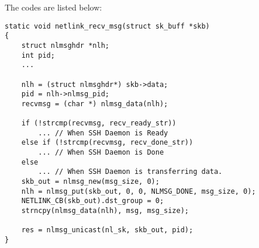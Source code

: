 The codes are listed below:
\newpage
\begin{lstlisting}[title=\bfseries Message Receiving]
static void netlink_recv_msg(struct sk_buff *skb)
{
    struct nlmsghdr *nlh;
    int pid;
	...   

    nlh = (struct nlmsghdr*) skb->data;
    pid = nlh->nlmsg_pid;
    recvmsg = (char *) nlmsg_data(nlh);

    if (!strcmp(recvmsg, recv_ready_str))
        ... // When SSH Daemon is Ready
    else if (!strcmp(recvmsg, recv_done_str))
    	... // When SSH Daemon is Done
    else
    	... // When SSH Daemon is transferring data.
    skb_out = nlmsg_new(msg_size, 0);
    nlh = nlmsg_put(skb_out, 0, 0, NLMSG_DONE, msg_size, 0);
    NETLINK_CB(skb_out).dst_group = 0;
    strncpy(nlmsg_data(nlh), msg, msg_size);

    res = nlmsg_unicast(nl_sk, skb_out, pid);
}
\end{lstlisting}
